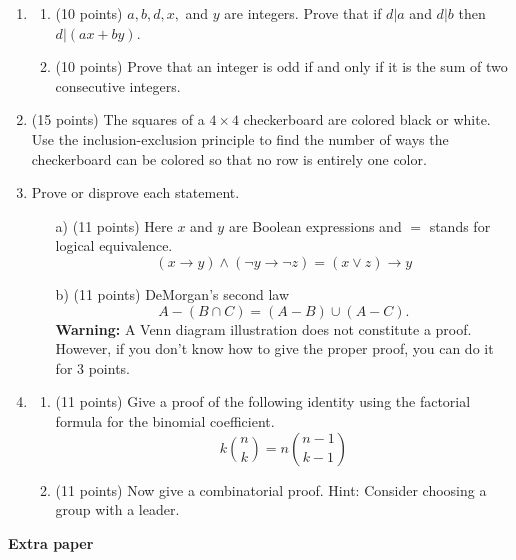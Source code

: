 \documentclass[12pt]{article}
\begin{document}
\begin{enumerate}
\item

\begin{enumerate}
\item (10 points) $a,b,d,x,$ and $y$ are integers. Prove that if $d|a$ and $d|b$ then $d|(ax+by)$. \vspace{7cm}

\item (10 points) Prove that an integer is odd if and only if it is the sum of two consecutive integers.
\end{enumerate}


\newpage
\item (15 points) The squares of a $4\times 4$ checkerboard are colored black or white. Use the inclusion-exclusion principle to find the number of ways the checkerboard can be colored so that no row is entirely one color.

\newpage
\item Prove or disprove each statement.
\begin{itemize}
\item[a)] (11 points) Here $x$ and $y$ are Boolean expressions and $=$ stands for logical equivalence. 
\[
(x\to y)\wedge(\neg y\to\neg z)=(x\vee z)\to y
\]
\item[b)] (11 points) DeMorgan's second law
\[
 A-(B\cap C)=(A-B)\cup (A-C).
\]
\textbf{Warning:} A Venn diagram illustration does not constitute a proof. However, if you don't know how to give the proper proof, you can do it for 3 points.
\end{itemize}
\newpage
\item 
\begin{enumerate}

\item (11 points) Give a proof of the following identity using the factorial formula for the binomial coefficient.
\[
k\binom{n}{k}=n\binom{n-1}{k-1}
\]\vspace{6cm}

\item (11 points) Now give a combinatorial proof.
Hint: Consider choosing a group with a leader.

\end{enumerate}
\end{enumerate}

\newpage
\noindent
\textbf{Extra paper}
%

%
\end{document}
